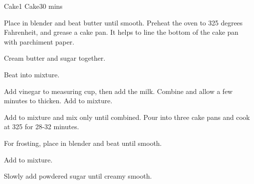 \begin{recipe}{Cake}{1 Cake}{30 mins}

  
  Place in blender and beat butter until smooth.  Preheat the oven to 325 degrees Fahrenheit, and grease a cake pan.  It helps to line the bottom of the cake pan with parchiment paper.


  Cream butter and sugar together.


  Beat into mixture.


  Add vinegar to measuring cup, then add the milk.  Combine and allow a few minutes to thicken.  Add to mixture.


  Add to mixture and mix only until combined.  Pour into three cake pans and cook at 325 for 28-32 minutes.
  

  For frosting, place in blender and beat until smooth.


  Add to mixture.


  Slowly add powdered sugar until creamy smooth.

\end{recipe}
